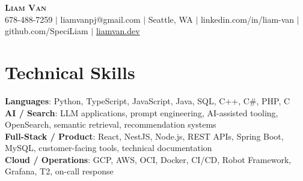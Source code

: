\documentclass[letterpaper,11pt]{article}
\begin{document}

%
\begin{center}
    \textbf{\Huge \scshape Liam Van} \\ \vspace{1pt}
    \small 678-488-7259 $|$ \small {liamvanpj@gmail.com} $|$ Seattle, WA
 {{$|$ linkedin.com/in/liam-van} {$|$ github.com/SpeciLiam} {$|$ \href{https://liamvan.dev}{liamvan.dev}}}

\end{center}

\section{Technical Skills}
 \begin{itemize}[leftmargin=0.15in, label={}]
    \small{\item{
     \textbf{Languages}{: Python, TypeScript, JavaScript, Java, SQL, C++, C\#, PHP, C} \\
     \textbf{AI / Search}{: LLM applications, prompt engineering, AI-assisted tooling, OpenSearch, semantic retrieval, recommendation systems} \\
     \textbf{Full-Stack / Product}{: React, NestJS, Node.js, REST APIs, Spring Boot, MySQL, customer-facing tools, technical documentation} \\
     \textbf{Cloud / Operations}{: GCP, AWS, OCI, Docker, CI/CD, Robot Framework, Grafana, T2, on-call response} \\
    }}
 \end{itemize}
%
\end{document}
